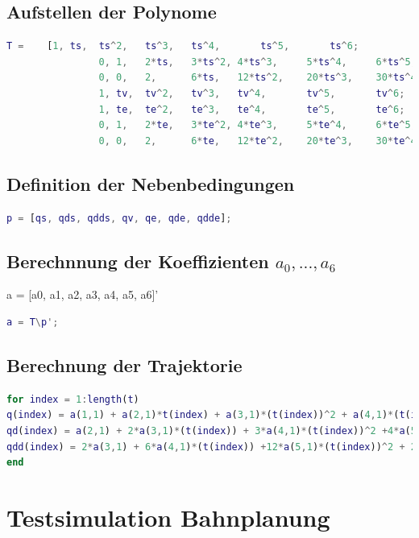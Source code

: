 \subsection{Aufstellen der Polynome}
%
\begin{lstlisting}[language=Matlab, numbers=none]
T =    [1, ts, 	ts^2, 	ts^3, 	ts^4, 		ts^5, 		ts^6;
				0, 1, 	2*ts, 	3*ts^2, 4*ts^3, 	5*ts^4, 	6*ts^5;
				0, 0, 	2, 		6*ts, 	12*ts^2,	20*ts^3,	30*ts^4;
				1, tv, 	tv^2, 	tv^3, 	tv^4, 		tv^5, 		tv^6;
				1, te, 	te^2, 	te^3, 	te^4, 		te^5, 		te^6;
				0, 1, 	2*te, 	3*te^2, 4*te^3, 	5*te^4,	 	6*te^5;
				0, 0, 	2, 		6*te, 	12*te^2,	20*te^3,	30*te^4];
\end{lstlisting}
%
\subsection{Definition der Nebenbedingungen}
%
\begin{lstlisting}[language=Matlab, numbers=none]
p = [qs, qds, qdds, qv, qe, qde, qdde];
\end{lstlisting}
%
\subsection{Berechnnung der Koeffizienten $a_0,...,a_6$}
%
\begin{par}
	a = [a0, a1, a2, a3, a4, a5, a6]'
\end{par} \vspace{1em}
\begin{lstlisting}[language=Matlab, numbers=none]
a = T\p';
\end{lstlisting}
%
\subsection{Berechnung der Trajektorie}
%
\begin{lstlisting}[language=Matlab, numbers=none]
for index = 1:length(t)
q(index) = a(1,1) + a(2,1)*t(index) + a(3,1)*(t(index))^2 + a(4,1)*(t(index))^3 +a(5,1)*(t(index))^4 + a(6,1)*(t(index))^5 + a(7,1)*(t(index))^6;
qd(index) = a(2,1) + 2*a(3,1)*(t(index)) + 3*a(4,1)*(t(index))^2 +4*a(5,1)*(t(index))^3 + 5*a(6,1)*(t(index))^4 + 6*a(7,1)*(t(index))^5;
qdd(index) = 2*a(3,1) + 6*a(4,1)*(t(index)) +12*a(5,1)*(t(index))^2 + 20*a(6,1)*(t(index))^3 + 30*a(7,1)*(t(index))^4;
end
\end{lstlisting}
%
\setcounter{section}{4}
\section{Testsimulation Bahnplanung}
\label{add:sim}
%
